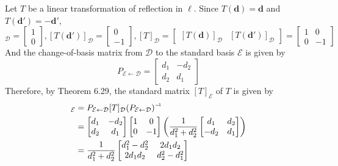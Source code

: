 Let $T$ be a linear transformation of reflection in $\ell$. Since $T(\textbf{d}) = \textbf{d}$ and $T(\textbf{d}') = -\textbf{d}'$, \begin{equation*}
	[T(\textbf{d})]_\mathcal{D} = \begin{bmatrix}
		1 \\ 0
	\end{bmatrix}, [T(\textbf{d}')]_\mathcal{D} = \begin{bmatrix}
		0 \\ -1
	\end{bmatrix}, [T]_\mathcal{D} = \begin{bmatrix}
		\left[T(\textbf{d})\right]_\mathcal{D} & [T(\textbf{d}')]_\mathcal{D}
	\end{bmatrix}  = \begin{bmatrix}
	1 & 0 \\ 0 & -1
	\end{bmatrix}
\end{equation*} And the change-of-basis matrix from $\mathcal{D}$ to the standard basis $\mathcal{E}$ is given by \begin{equation*}
	P_{ \mathcal{E} \leftarrow \mathcal{D} } = \begin{bmatrix}
		d_1 & -d_2 \\ d_2 & d_1
	\end{bmatrix}
\end{equation*} Therefore, by Theorem 6.29, the standard matrix $[T]_\mathcal{E}$ of $T$ is given by \begin{align*}
	[T]_\mathcal{E} &= P_{ \mathcal{E} \leftarrow \mathcal{D} }[T]_\mathcal{D}\inv{(P_{ \mathcal{E} \leftarrow \mathcal{D} })} \\
	&= \begin{bmatrix}
		d_1 & -d_2 \\ d_2 & d_1
	\end{bmatrix}\begin{bmatrix}
		1 & 0 \\ 0 & -1
	\end{bmatrix}\left(\frac{1}{d_1^2 + d_2^2}\begin{bmatrix}
		d_1 & d_2 \\ -d_2 & d_1
	\end{bmatrix}\right) \\
	&= \frac{1}{d_1^2 + d_2^2}\begin{bmatrix}
		d_1^2 - d_2^2 & 2d_1d_2 \\ 2d_1d_2 & d_2^2 - d_1^2
	\end{bmatrix}
\end{align*}

